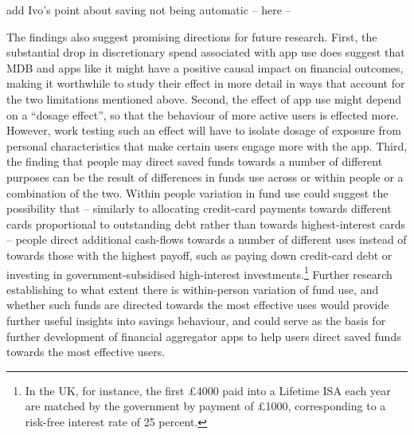 add Ivo's point about saving not being automatic -- here -- 

The findings also suggest promising directions for future research. First, the
substantial drop in discretionary spend associated with app use does suggest
that MDB and apps like it might have a positive causal impact on financial
outcomes, making it worthwhile to study their effect in more detail in ways
that account for the two limitations mentioned above. Second, the effect of app
use might depend on a ``dosage effect'', so that the behaviour of more active
users is effected more. However, work testing such an effect will have to
isolate dosage of exposure from personal characteristics that make certain
users engage more with the app. Third, the finding that people may direct saved
funds towards a number of different purposes can be the result of differences
in funds use across or within people or a combination of the two. Within people
variation in fund use could suggest the possibility that -- similarly to
allocating credit-card payments towards different cards proportional to
outstanding debt rather than towards highest-interest cards
\citet{gathergood2019individuals} -- people direct additional cash-flows
towards a number of different uses instead of towards those with the highest
payoff, such as paying down credit-card debt or investing in
government-subsidised high-interest investments.\footnote{In the UK, for
    instance, the first \pounds4000 paid into a Lifetime ISA each year are
matched by the government by payment of \pounds1000, corresponding to a
risk-free interest rate of 25 percent.} Further research establishing to what
extent there is within-person variation of fund use, and whether such funds are
directed towards the most effective uses would provide further useful insights
into savings behaviour, and could serve as the basis for further development of
financial aggregator apps to help users direct saved funds towards the most
effective users.


